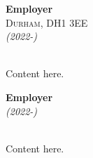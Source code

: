 \documentclass{article}
\begin{document}
\begin{center}
    \textbf{Employer} \\
    \textsc{Durham, DH1 3EE} \\
    \textit{(2022-)} \\~\\
    
    \begin{justify}
    Content here.
    \end{justify}
\end{center}

\centerbreak

\begin{center}
    \textbf{Employer} \\
    \textit{(2022-)} \\~\\
    
    \begin{justify}
    Content here. 
    \end{justify}
\end{center}

\let\centerbreak\undefined

\vfill
\end{document}
